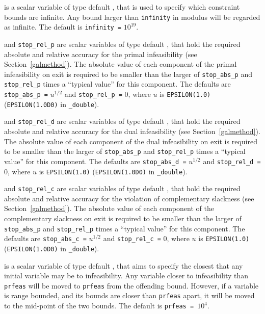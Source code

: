 \begin{description}
 is a scalar variable of type default \realdp, that is used to
specify which constraint bounds are infinite.
Any bound larger than {\tt infinity} in modulus will be regarded as infinite.
The default is {\tt infinity =} $10^{19}$.

 and {\tt stop\_rel\_p}
are scalar variables of type default \realdp, that hold the
required absolute and relative accuracy for the primal infeasibility
(see Section~\ref{galmethod}).
The absolute value of each component of the primal infeasibility
on exit is required to be smaller than the larger of {\tt stop\_abs\_p} and
{\tt stop\_rel\_p} times a ``typical value'' for this component.
The defaults are {\tt stop\_abs\_p =} $u^{1/2}$ and
{\tt stop\_rel\_p =} $0$,
where $u$ is {\tt EPSILON(1.0)} ({\tt EPSILON(1.0D0)} in
{\tt \fullpackagename\_double}).

 and {\tt stop\_rel\_d}
are scalar variables of type default \realdp, that hold the
required absolute and relative accuracy for the dual infeasibility
(see Section~\ref{galmethod}).
The absolute value of each component of the dual infeasibility
on exit is required to be smaller than the larger of {\tt stop\_abs\_p} and
{\tt stop\_rel\_p} times a ``typical value'' for this component.
The defaults are {\tt stop\_abs\_d =} $u^{1/2}$ and
{\tt stop\_rel\_d =} $0$,
where $u$ is {\tt EPSILON(1.0)} ({\tt EPSILON(1.0D0)} in
{\tt \fullpackagename\_double}).

 and {\tt stop\_rel\_c}
are scalar variables of type default \realdp, that hold the
required absolute and relative accuracy
for the violation of complementary slackness
(see Section~\ref{galmethod}).
The absolute value of each component of the complementary slackness
on exit is required to be smaller than the larger of {\tt stop\_abs\_p} and
{\tt stop\_rel\_p} times a ``typical value'' for this component.
The defaults are {\tt stop\_abs\_c =} $u^{1/2}$ and
{\tt stop\_rel\_c =} $0$,
where $u$ is {\tt EPSILON(1.0)} ({\tt EPSILON(1.0D0)} in
{\tt \fullpackagename\_double}).

 is a scalar variable of type default \realdp, that aims to specify
the closest that any initial variable may be to infeasibility. Any variable
closer to infeasibility than {\tt prfeas} will be moved to {\tt prfeas} from
the offending bound. However, if a variable is range bounded, and its bounds
are closer than {\tt prfeas} apart, it will be moved to the mid-point of the
two bounds.
The default is {\tt prfeas = $10^4$}.


\end{description}
